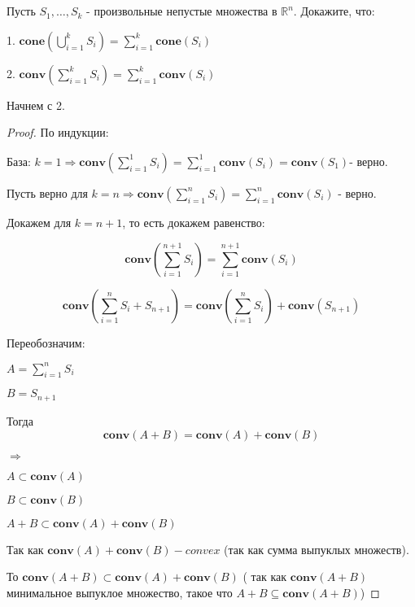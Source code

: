 \documentclass[a4paper,12pt]{article}
\begin{document}
\section{}

Пусть $S_1, \ldots, S_k$ - произвольные непустые множества в $\mathbb{R}^n$. Докажите, что:

1. $ \mathbf{cone} \left( \bigcup\limits_{i=1}^k S_i\right) = \sum\limits_{i=1}^k \mathbf{cone} \left( S_i\right) $

2. $ \mathbf{conv} \left( \sum\limits_{i=1}^k S_i\right) = \sum\limits_{i=1}^k \mathbf{conv} \left( S_i\right) $

Начнем с 2.

\begin{proof}

По индукции:

База: $k = 1 \Rightarrow \mathbf{conv} \left( \sum\limits_{i=1}^1 S_i\right) = \sum\limits_{i=1}^1 \mathbf{conv}\left( S_i\right) = \mathbf{conv} \left( S_1\right)$- верно.

Пусть верно для $k = n \Rightarrow \mathbf{conv} \left( \sum\limits_{i=1}^n S_i\right) = \sum\limits_{i=1}^n \mathbf{conv} \left( S_i\right) $ - верно.

Докажем для $k = n+1$, то есть докажем равенство: 

$$\mathbf{conv} \left( \sum\limits_{i=1}^{n+1} S_i\right) = \sum\limits_{i=1}^{n+1} \mathbf{conv} \left( S_i\right)$$

$$\mathbf{conv} \left( \sum\limits_{i=1}^{n} S_i + S_{n+1}\right) = \mathbf{conv} \left(\sum\limits_{i=1}^{n} S_i\right) + \mathbf{conv}\left( S_{n+1}\right)$$

Переобозначим:

$A = \sum\limits_{i=1}^{n} S_i$

$B = S_{n+1}$

Тогда $$\mathbf{conv}\left( A +B\right) = \mathbf{conv}\left( A \right)+ \mathbf{conv}\left( B\right)$$

$\Longrightarrow $

$A \subset \mathbf{conv}\left( A \right)$

$B \subset \mathbf{conv}\left( B \right)$

$A + B \subset \mathbf{conv}\left( A\right) + \mathbf{conv}\left( B\right)$

Так как $\mathbf{conv}\left( A\right) + \mathbf{conv}\left( B\right) - convex$ (так как сумма выпуклых множеств).

То $\mathbf{conv}\left( A + B\right)\subset\mathbf{conv}\left( A\right) + \mathbf{conv}\left( B\right)$ ( так как $\mathbf{conv}\left( A + B\right)$ минимальное выпуклое множество, такое что $A+B \subseteq \mathbf{conv}\left( A + B\right)$)


\end{proof}
\end{document}
